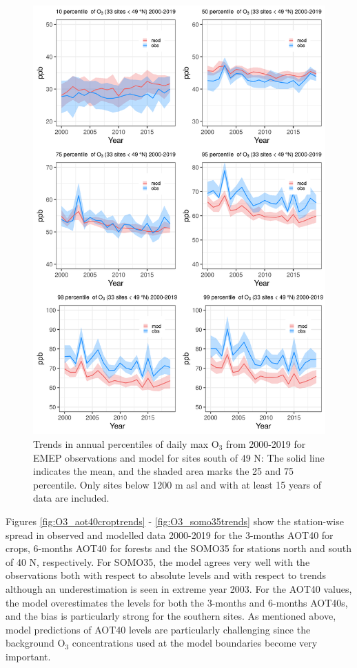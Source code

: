 \begin{figure}[h]
	\centering
	\includegraphics[width=0.74\paperwidth]{FIGS_TRENDS/alltrends_south_49_2000_2019_1200m.png}
	\caption{\label{fig:O3_perctrends_S}Trends in annual percentiles of daily max O$_3$ from 2000-2019 for EMEP observations and model for sites south of 49 N: The solid line indicates the mean, and the shaded area marks the 25 and 75 percentile. Only sites below 1200 m asl and with at least 15 years of data are included.}
\end{figure}


Figures \ref{fig:O3_aot40croptrends} - \ref{fig:O3_somo35trends} show the station-wise spread in observed and modelled data 2000-2019 for the 3-months AOT40 for crops, 6-months AOT40 for forests and the SOMO35 for stations north and south of 40 \degrees N, respectively. For SOMO35, the model agrees very well with the observations both with respect to absolute levels and with respect to trends although an underestimation is seen in extreme year 2003. For the AOT40 values, the model overestimates the levels for both the 3-months and 6-months AOT40s, and the bias is particularly strong for the southern sites. As mentioned above, model predictions of AOT40 levels are particularly challenging since the background O$_3$ concentrations used at the model boundaries become very important.


